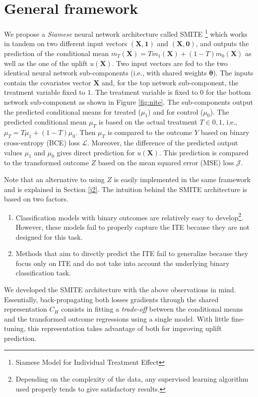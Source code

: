 \documentclass{article}
\def\X{\mathbf X}
\begin{document}
\section{General framework}
\label{methodology}

We propose a \textit{Siamese} neural network \citep{bromley1994signature} architecture called SMITE \footnote{Siamese Model for Individual Treatment Effect} which works in tandem on two different input vectors $(\X,\mathbf{1})$ and $(\X,\mathbf{0})$, and outputs the prediction of the conditional mean $m_T(\X) = Tm_1(\X) + (1-T)m_0(\X)$ as well as the one of the uplift $u(\X)$. Two input vectors are fed to the two identical neural network sub-components (i.e., with shared weights $\boldsymbol{\theta}$). The inputs contain the covariates vector $\X$ and, for the top network sub-component, the treatment variable fixed to $1$. The treatment variable is fixed to $0$ for the bottom network sub-component as shown in Figure \ref{fig:nite}. The sub-components output the predicted conditional means for treated ($\mu_1$) and for control ($\mu_0$). The predicted conditional mean $\mu_T$ is based on the actual treatment $T \in {0,1}$, i.e., $\mu_T = T\mu_1 + (1-T)\mu_0$. Then $\mu_T$ is compared to the outcome $Y$ based on binary cross-entropy (BCE) loss $\mathcal{L}$. Moreover, the difference of the predicted output values $\mu_1$ and $\mu_0$ gives direct prediction for $u(\X)$. This prediction is compared to the transformed outcome $Z$ based on the mean squared error (MSE) loss $\mathcal{J}$.

Note that an alternative to using $Z$ is easily implemented in the same framework and is explained in Section \ref{j2}. The intuition behind the SMITE architecture is based on two factors. 

\begin{enumerate}
  \item Classification models with binary outcomes are relatively easy to develop\footnote{Depending on the complexity of the data, any supervised learning algorithm used properly tends to give satisfactory results.}. However, these models fail to properly capture the ITE because they are not designed for this task.
  \item Methods that aim to directly predict the ITE fail to generalize because they focus only on ITE and do not take into account the underlying binary classification task.
\end{enumerate}

We developed the SMITE architecture with the above observations in mind. Essentially, back-propagating both losses gradients through the shared representation $C_H$ consists in fitting a {\it trade-off} between the conditional means and the transformed outcome regressions using a single model. With little fine-tuning, this representation takes advantage of both for improving uplift prediction.
\end{document}
